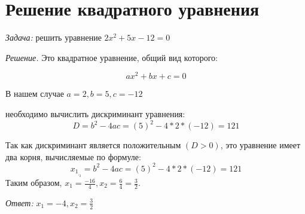\documentclass{article}
\begin{document}
\section{
Решение квадратного уравнения
}
\textit {Задача:} решить уравнение $2x^2 + 5x - 12 = 0$

\textit {Решение.} Это квадратное уравнение, общий вид которого:

\[ ax^2 + bx + c= 0 \]

В нашем случае $a = 2, b = 5, c = -12 $

 необходимо вычислить дискриминант уравнения:
\[D = b^2 - 4ac = (5)^2 - 4 * 2 * (-12) = 121\]

Так как дискриминант является положительным $(D > 0)$, это уравнение
имеет два корня, вычисляемые по формуле:
\[x_1_,_2 = b^2 - 4ac = (5)^2 - 4 * 2 * (-12) = 121\]
Таким образом, $x_1 = \frac{-16}{4} , x_2 = \frac{6}{4} = \frac{3}{2}.$

\quad \textit{Ответ:} $x_1 = -4, x_2 = \frac{3}{2}$
\end{document}
